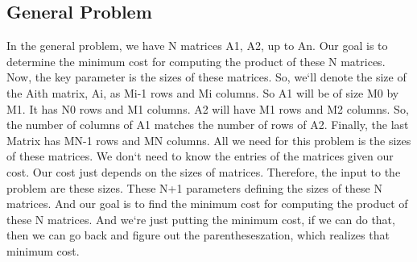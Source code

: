 \subsection{General Problem}
In the general problem, we have N matrices A1, A2, up to An.
Our goal is to determine the minimum cost for computing the product of these N matrices.
Now, the key parameter is the sizes of these matrices.
So, we`ll denote the size of the Aith matrix, Ai, as Mi-1 rows and Mi columns.
So A1 will be of size M0 by M1.
It has N0 rows and M1 columns.
A2 will have M1 rows and M2 columns.
So, the number of columns of A1 matches the number of rows of A2.
Finally, the last Matrix has MN-1 rows and MN columns.
All we need for this problem is the sizes of these matrices.
We don`t need to know the entries of the matrices given our cost.
Our cost just depends on the sizes of matrices.
Therefore, the input to the problem are these sizes.
These N+1 parameters defining the sizes of these N matrices.
And our goal is to find the minimum cost for computing the product of these N matrices.
And we`re just putting the minimum cost, if we can do that, then we can go back and figure out the parentheseszation, which realizes that minimum cost.

